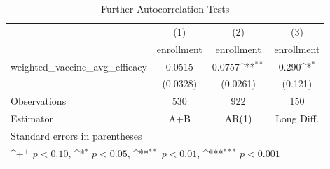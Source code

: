 \begin{table}[htbp]\centering
\def\sym#1{\ifmmode^{#1}\else\(^{#1}\)\fi}
\caption{Further Autocorrelation Tests}
\begin{tabular}{l*{3}{c}}
\toprule
                &\multicolumn{1}{c}{(1)}&\multicolumn{1}{c}{(2)}&\multicolumn{1}{c}{(3)}\\
                &\multicolumn{1}{c}{enrollment}&\multicolumn{1}{c}{enrollment}&\multicolumn{1}{c}{enrollment}\\
\midrule
weighted\_vaccine\_avg\_efficacy&   0.0515         &   0.0757\sym{**} &    0.290\sym{*}  \\
                & (0.0328)         & (0.0261)         &  (0.121)         \\
\midrule
Observations    &      530         &      922         &      150         \\
Estimator       &      A+B         &    AR(1)         &Long Diff.         \\
\bottomrule
\multicolumn{4}{l}{\footnotesize Standard errors in parentheses}\\
\multicolumn{4}{l}{\footnotesize \sym{+} \(p<0.10\), \sym{*} \(p<0.05\), \sym{**} \(p<0.01\), \sym{***} \(p<0.001\)}\\
\end{tabular}
\end{table}
